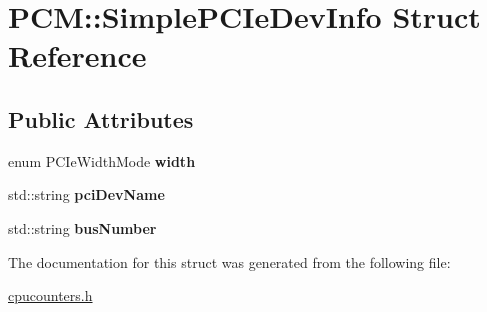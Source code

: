 \hypertarget{struct_p_c_m_1_1_simple_p_c_ie_dev_info}{}\section{P\+CM\+:\+:Simple\+P\+C\+Ie\+Dev\+Info Struct Reference}
\label{struct_p_c_m_1_1_simple_p_c_ie_dev_info}
\subsection*{Public Attributes}
\begin{DoxyCompactItemize}
\item 
\mbox{\label{struct_p_c_m_1_1_simple_p_c_ie_dev_info_aa0e968e867b25f2768660045e732fa99}} 
enum P\+C\+Ie\+Width\+Mode {\bfseries width}
\item 
\mbox{\label{struct_p_c_m_1_1_simple_p_c_ie_dev_info_a4722c35d989dbf2d336d598ee1319a18}} 
std\+::string {\bfseries pci\+Dev\+Name}
\item 
\mbox{\label{struct_p_c_m_1_1_simple_p_c_ie_dev_info_a7f715c7d0e27d8818e45959c7f784544}} 
std\+::string {\bfseries bus\+Number}
\end{DoxyCompactItemize}


The documentation for this struct was generated from the following file\+:\begin{DoxyCompactItemize}
\item 
\mbox{\hyperlink{cpucounters_8h}{cpucounters.\+h}}\end{DoxyCompactItemize}
